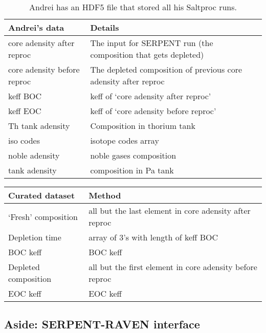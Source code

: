 \documentclass{article}
\begin{document}
\begin{table}
\begin{center}
\begin{tabular}{ l l }
    \hline
    Andrei's data & Details \\
    \hline
    core adensity after reproc & The input for SERPENT run (the composition that gets depleted) \\ 
    core adensity before reproc & The depleted composition of previous core adensity after reproc \\
    keff BOC & keff of `core adensity after reproc' \\
    keff EOC & keff of `core adensity before reproc' \\
    Th tank adensity & Composition in thorium tank \\
    iso codes & isotope codes array \\
    noble adensity & noble gases composition \\
    tank adensity & composition in Pa tank \\
    \hline
\end{tabular}
\end{center}
\caption{Andrei has an HDF5 file that stored all his Saltproc runs.}
\label{tab:andrei}
\end{table}

\begin{table}
\begin{center}
\begin{tabular}{ l l }
    \hline
    Curated dataset & Method \\
    \hline
    `Fresh' composition & all but the last element in core adensity after reproc  \\
    Depletion time & array of 3's with length of keff BOC \\
    BOC keff & BOC keff \\
    Depleted composition & all but the first element in core adensity before reproc \\  
    EOC keff & EOC keff \\
    \hline
\end{tabular}
\label{tab:csv}
\end{center}
\end{table}


\subsection*{Aside: SERPENT-RAVEN interface}
\end{document}
